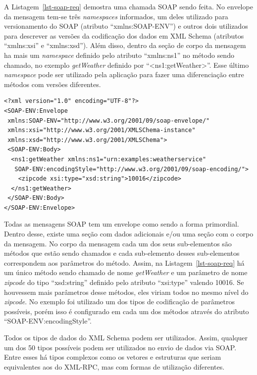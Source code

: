 A Listagem~\ref{lst-soap-req} demostra uma chamada SOAP sendo feita. No envelope
da mensagem tem-se três \emph{namespaces} informados, um deles utilizado para
versionamento do SOAP (atributo ``xmlns:SOAP-ENV'') e outros dois utilizados
para descrever as versões da codificação dos dados em XML Schema (atributos
``xmlns:xsi'' e ``xmlns:xsd''). Além disso, dentro da seção de corpo da mensagem
ha mais um \emph{namespace} definido pelo atributo ``xmlns:ns1'' no método
sendo chamado, no exemplo \emph{getWeather} definido por ``<ns1:getWeather>''.
Esse último \emph{namespace} pode ser utilizado pela aplicação para fazer
uma diferenciação entre métodos com versões diferentes.

\lstset{linewidth=140mm}
\begin{center}
    \begin{minipage}{140mm}
	\begin{lstlisting}[frame=trbl, caption=Exemplo de chamada SOAP com os cabeçalhos HTTP sendo omitidos \cite{cerami2002web}., label=lst-soap-req]
<?xml version="1.0" encoding="UTF-8"?>
<SOAP-ENV:Envelope
 xmlns:SOAP-ENV="http://www.w3.org/2001/09/soap-envelope/"
 xmlns:xsi="http://www.w3.org/2001/XMLSChema-instance"
 xmlns:xsd="http://www.w3.org/2001/XMLSChema">
 <SOAP-ENV:Body>
  <ns1:getWeather xmlns:ns1="urn:examples:weatherservice"
   SOAP-ENV:encodingStyle="http://www.w3.org/2001/09/soap-encoding/">
    <zipcode xsi:type="xsd:string">10016</zipcode>
  </ns1:getWeather>
 </SOAP-ENV:Body>
</SOAP-ENV:Envelope>
	\end{lstlisting}
	\end{minipage}
\end{center}

Todas as mensagens SOAP tem um envelope como sendo a forma primordial. Dentro
desse, existe uma seção com dados adicionais e/ou uma seção com o corpo
da mensagem. No corpo da mensagem cada um dos seus sub-elementos são métodos
que estão sendo chamados e cada sub-elemento desses sub-elementos correspondem
aos parâmetros do método. Assim, na Listagem~\ref{lst-soap-req} há um único método sendo
chamado de nome \emph{getWeather} e um parâmetro de nome \emph{zipcode} do
tipo ``xsd:string'' definido pelo atributo ``xsi:type'' valendo 10016. Se houvessem
mais parâmetros desse métodos, eles viriam todos no mesmo nível do \emph{zipcode}.
No exemplo foi utilizado um dos tipos de codificação de parâmetros possíveis, porém
isso é configurado em cada um dos métodos através do atributo ``SOAP-ENV:encodingStyle''.

Todos os tipos de dados do XML Schema
podem ser utilizados. Assim, qualquer um dos 50 tipos possíveis podem
ser utilizados no envio de dados via SOAP. Entre esses há tipos complexos
como os vetores e estruturas que seriam equivalentes aos do XML-RPC,
mas com formas de utilização diferentes.

